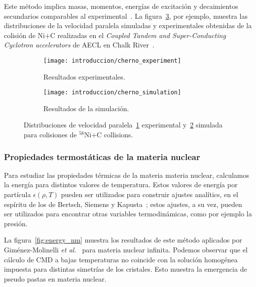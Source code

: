 Este método implica masas, momentos, energías de excitación y decaimientos secundarios comparables al experimental~\cite{belkacem_searching_1996,chernomoretz_quasiclassical_2002}.
La figura~\ref{fig:distribution}, por ejemplo, muestra las distribuciones de la velocidad paralela simuladas y experimentales obtenidas de la colisión de $\text{Ni+C}$ realizadas en el \emph{Coupled Tandem and Super-Conducting Cyclotron accelerators} de AECL en Chalk River~\cite{chernomoretz_quasiclassical_2002}.

\begin{figure}[h]
  \begin{subfigure}[h!]{\columnwidth}
    \texttt{[image: introduccion/cherno\_experiment]}
    \caption{Resultados experimentales.}
    \label{sfig:exp}
  \end{subfigure}
  \begin{subfigure}[h!]{\columnwidth}
    \texttt{[image: introduccion/cherno\_simulation]}
    \caption{Resultados de la simulación.}
    \label{sfig:sim}
  \end{subfigure}
  \centering
  \caption{Distribuciones de velocidad paralela~\ref{sfig:exp} experimental y~\ref{sfig:sim} simulada para colisiones de ${}^{58}\text{Ni+C}$ collisions.}
  \label{fig:distribution}
\end{figure}


\subsubsection{Propiedades termostáticas de la materia nuclear}
Para estudiar las propiedades térmicas de la materia materia nuclear, calculamos la energía para distintos valores de temperatura.
Estos valores de energía por partícula $\epsilon(\rho,T)$ pueden ser utilizados para construir ajustes analítics, en el espíritu de los de Bertsch, Siemens y Kapusta~\cite{bertsch_nuclear_1983, kapusta_deuteron_1984,
  lopez_nuclear_1984}; estos ajustes, a su vez, pueden ser utilizados para encontrar otras variables termodinámicas, como por ejemplo la presión.

La figura~\ref{fig:energy_nm} muestra los resultados de este método aplicados por Giménez-Molinelli \emph{et al.}~\cite{gimenez_molinelli_simulations_2014} para materia nuclear infinita.
Podemos observar que el cálculo de CMD a bajas temperaturas no coincide con la solución homogénea impuesta para distintas simetrías de los cristales.
Esto muestra la emergencia de pseudo pastas en materia nuclear.

